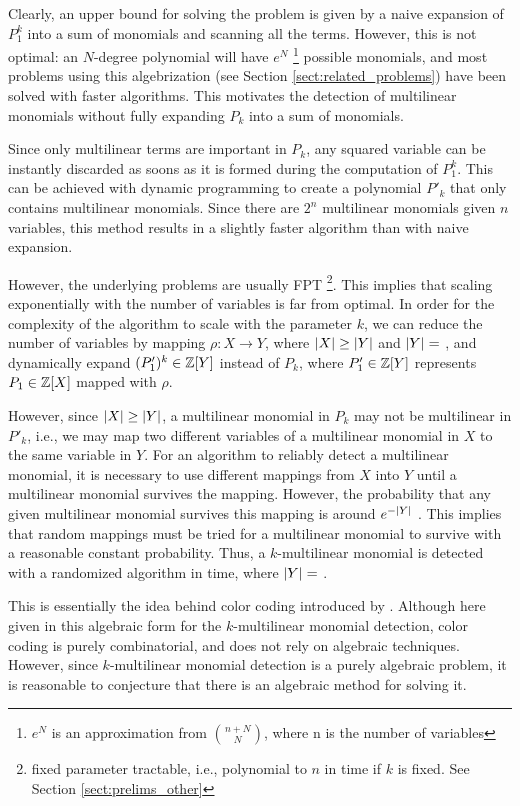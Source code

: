 Clearly, an upper bound for solving the problem is given by a 
naive expansion of $P_1^k$ into a sum of monomials and scanning all the terms. 
However, this is not optimal: an $N$-degree polynomial will have $e^N$
\footnote{$e^N$ is an approximation from $\binom{n+N}{N}$, where n is the number of variables} 
possible monomials, and most problems using this algebrization 
(see Section \ref{sect:related_problems}) 
have been solved with faster algorithms. 
This motivates the detection of multilinear monomials 
without fully expanding $P_k$ into a sum of monomials.

Since only multilinear terms are important in $P_k$, 
any squared variable can be instantly discarded as soons as it is formed 
during the computation of $P_1^k$. 
This can be achieved with dynamic programming 
to create a polynomial $P'_k$ that 
only contains multilinear monomials. 
Since there are $2^n$ multilinear monomials given $n$ variables, 
this method results in a slightly 
faster algorithm than with naive expansion.

However, the underlying problems are usually FPT
\footnote{fixed parameter tractable, i.e., 
polynomial to $n$ in time if $k$ is fixed. See Section \ref{sect:prelims_other}}. 
This implies that scaling exponentially 
with the number of variables is far from optimal. 
In order for the complexity of the algorithm to scale 
with the parameter $k$, we can reduce the number of variables 
by mapping $\rho \colon X \to Y$, where 
${\left\vert X\right\vert} \geq {\left\vert Y\right\vert}$ and ${\left\vert Y\right\vert} =$ , 
and dynamically expand $(P'_1)^k \in \mathbb Z[Y]$ instead of
$P_k$, where $P'_1 \in \mathbb Z[Y]$ represents $P_1 \in \mathbb Z[X]$ mapped with $\rho$. 

However, since ${\left\vert X\right\vert} \geq {\left\vert Y\right\vert}$, 
a multilinear monomial in $P_k$ may not be multilinear in $P'_k$, 
i.e., we may map two different variables of a multilinear monomial in $X$ 
to the same variable in $Y$. 
For an algorithm to reliably detect a multilinear monomial, 
it is necessary to use different mappings 
from $X$ into $Y$ until a multilinear monomial survives the mapping. 
However, the probability that any given 
multilinear monomial survives this mapping is around $e^{-{\left\vert Y\right\vert}}$ \cite{KouWil15}. 
This implies that 
 random mappings must be tried for a 
multilinear monomial to survive with a reasonable constant probability. Thus, a 
$k$-multilinear monomial is detected with a 
randomized algorithm in  time, where ${\left\vert Y\right\vert} =$ .

This is essentially the idea behind color coding 
introduced by \citeauthor{Alon95} \cite{Alon95}. 
Although here given in this algebraic form for 
the $k$-multilinear monomial detection, 
color coding is purely combinatorial, 
and does not rely on algebraic techniques. 
However, since $k$-multilinear monomial detection is a 
purely algebraic problem, it is reasonable to 
conjecture that there is an algebraic method for solving it.

